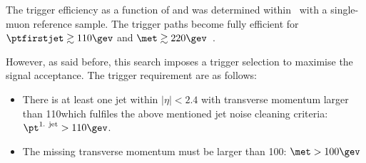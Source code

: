 The trigger efficiency as a function of \met and \ptfirstjet was determined within~\cite{bib:CMS:DM_8TeV} with a single-muon reference sample.
The trigger paths become fully efficient for \mbox{$\ptfirstjet \gtrsim 110\gev$} and \mbox{$\met \gtrsim 220\gev$~\cite{bib:CMS:DM_8TeV_AN}}.

However, as said before, this search imposes a trigger selection to maximise the signal acceptance.
The trigger requirement are as follows:
\begin{itemize}
\renewcommand{\labelitemi}{\footnotesize{\ding{118}}}
\item There is at least one jet within $|\eta|<2.4$ with transverse momentum larger than 110\gev which fulfiles the above mentioned jet noise cleaning criteria: \mbox{$\pt^{\text{1. jet}}>110\gev$}.
\item The missing transverse momentum must be larger than 100\gev: \mbox{$\met>100\gev$}
\end{itemize}

\hspace{0.9cm}

